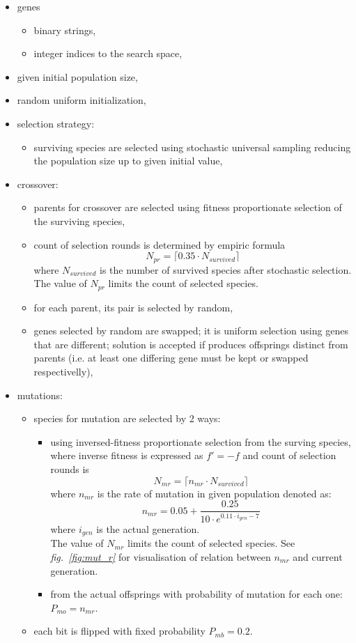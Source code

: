 \documentclass[a4paper,jurnal]{IEEEtran}
\begin{document}
\begin{itemize}
	\item genes 
	\begin{itemize}
		\item binary strings,
		\item integer indices to the search space,
	\end{itemize}
	\item given initial population size,
	\item random uniform initialization,
	\item selection strategy:
	\begin{itemize}
		\item surviving species are selected using stochastic universal 
		sampling reducing the population size up to given initial value,
	\end{itemize}
	\item crossover:
	\begin{itemize}
		\item parents for crossover are selected using fitness proportionate
		selection of the surviving species,
		\item count of selection rounds is determined by empiric formula
		\[ N_{pr} = \lceil 0.35\cdot N_{survived} \rceil \] 		
		where $ N_{survived} $ is the number of survived species after stochastic selection.
		The value of $ N_{pr} $ limits the count of selected species.
		\item for each parent, its pair is selected by random,
		\item genes selected by random are swapped; it is uniform selection using 
		genes that are different; solution is accepted if
		produces  offsprings distinct from parents (i.e. at least one differing gene must be kept or swapped respectivelly),
	\end{itemize}
\end{itemize}
\begin{itemize}
	\item mutations:
	\begin{itemize}
		\item species for mutation are selected by 2 ways:
		\begin{itemize}
			\item using inversed-fitness proportionate
			selection from the surving species, where inverse fitness is expressed as
			$ f'=-f  $
			and count of selection rounds is
			\[ N_{mr} = \lceil n_{mr}\cdot N_{survived} \rceil \]
			where 
			$ n_{mr} $  is the rate of mutation in given population denoted as:			
			\[ n_{mr} = 0.05+\dfrac{0.25}{10\cdot e^{0.11\cdot i_{gen}-7}}\]
			where
			$ i_{gen} $ is the actual generation.\\
			The value of $ N_{mr} $ limits the count of selected species. 
			See \textit{fig.~\ref{fig:mut_r}} for visualisation of relation between $ n_{mr} $ 
			and current generation.
			\item from the actual offsprings with probability of mutation for each one:
			$ P_{mo} = n_{mr} $.
		\end{itemize}
		\item each bit is flipped with fixed probability
		$ P_{mb} = 0.2 $.
	\end{itemize}
\end{itemize}
\end{document}
